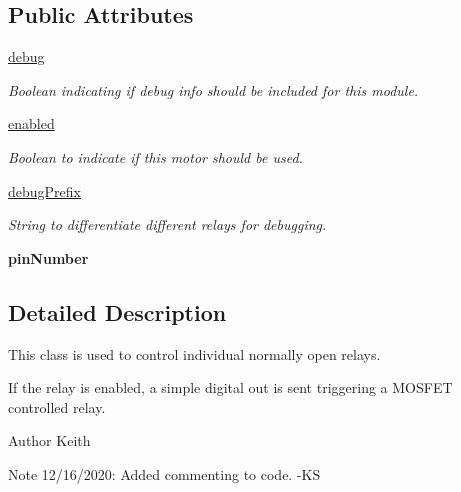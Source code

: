 \subsection*{Public Attributes}
\begin{DoxyCompactItemize}
\item 
\mbox{\label{classRelayControl_1_1RelayControl_a78f2bb3413b1a30e9d798b516b1cdbc9}} 
\hyperlink{classRelayControl_1_1RelayControl_a78f2bb3413b1a30e9d798b516b1cdbc9}{debug}
\begin{DoxyCompactList}\small\item\em Boolean indicating if debug info should be included for this module. \end{DoxyCompactList}\item 
\hyperlink{classRelayControl_1_1RelayControl_a2e1cc2648fbe560611f2eff54cb35aed}{enabled}
\begin{DoxyCompactList}\small\item\em Boolean to indicate if this motor should be used. \end{DoxyCompactList}\item 
\mbox{\label{classRelayControl_1_1RelayControl_ab89195e1772f999497371cf3c2ff0b33}} 
\hyperlink{classRelayControl_1_1RelayControl_ab89195e1772f999497371cf3c2ff0b33}{debug\+Prefix}
\begin{DoxyCompactList}\small\item\em String to differentiate different relays for debugging. \end{DoxyCompactList}\item 
\mbox{\label{classRelayControl_1_1RelayControl_a98ec3fccdd5f8558684a1ba8ea90e6c9}} 
{\bfseries pin\+Number}
\end{DoxyCompactItemize}


\subsection{Detailed Description}
This class is used to control individual normally open relays. 

If the relay is enabled, a simple digital out is sent triggering a M\+O\+S\+F\+ET controlled relay. \begin{DoxyAuthor}{Author}
Keith 
\end{DoxyAuthor}
\begin{DoxyNote}{Note}
12/16/2020\+: Added commenting to code. -\/\+KS 
\end{DoxyNote}


